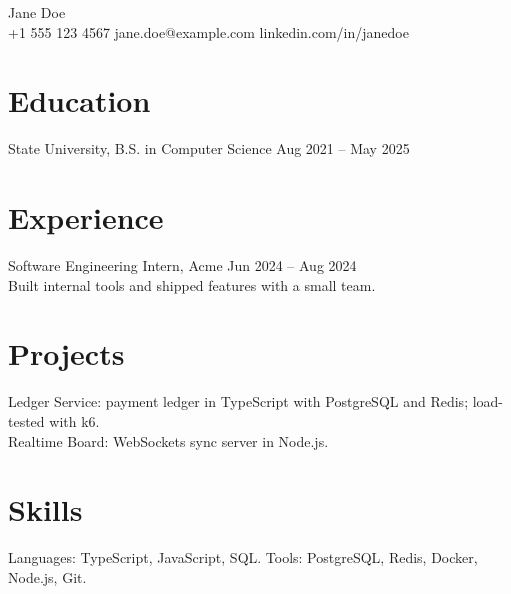 \documentclass[10pt]{article}
\begin{document}
\begin{center}{\Large Jane Doe}\\ +1 555 123 4567 \quad jane.doe@example.com \quad linkedin.com/in/janedoe\end{center}
\section*{Education}
State University, B.S. in Computer Science \hfill Aug 2021 -- May 2025
\section*{Experience}
Software Engineering Intern, Acme \hfill Jun 2024 -- Aug 2024\\
Built internal tools and shipped features with a small team.
\section*{Projects}
Ledger Service: payment ledger in TypeScript with PostgreSQL and Redis; load-tested with k6.\\
Realtime Board: WebSockets sync server in Node.js.
\section*{Skills}
Languages: TypeScript, JavaScript, SQL. Tools: PostgreSQL, Redis, Docker, Node.js, Git.
\end{document}
